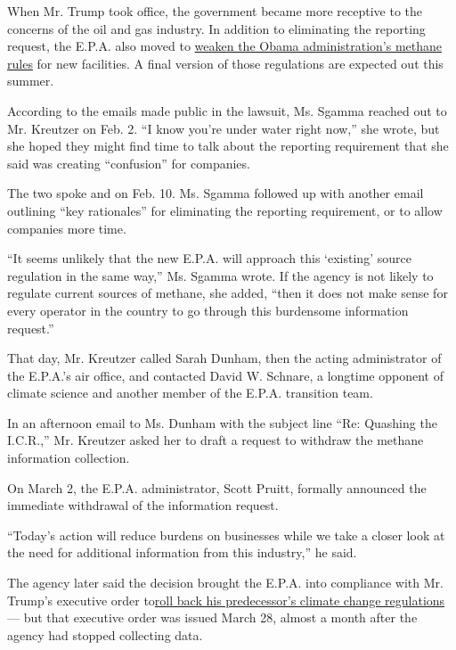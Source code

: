 When Mr. Trump took office, the government became more receptive to the
concerns of the oil and gas industry. In addition to eliminating the
reporting request, the E.P.A. also moved to
\href{https://www.nytimes3xbfgragh.onion/2018/09/10/climate/methane-emissions-epa.html}{weaken
the Obama administration's methane rules} for new facilities. A final
version of those regulations are expected out this summer.

According to the emails made public in the lawsuit, Ms. Sgamma reached
out to Mr. Kreutzer on Feb. 2. ``I know you're under water right now,''
she wrote, but she hoped they might find time to talk about the
reporting requirement that she said was creating ``confusion'' for
companies.

The two spoke and on Feb. 10. Ms. Sgamma followed up with another email
outlining ``key rationales'' for eliminating the reporting requirement,
or to allow companies more time.

``It seems unlikely that the new E.P.A. will approach this `existing'
source regulation in the same way,'' Ms. Sgamma wrote. If the agency is
not likely to regulate current sources of methane, she added, ``then it
does not make sense for every operator in the country to go through this
burdensome information request.''

That day, Mr. Kreutzer called Sarah Dunham, then the acting
administrator of the E.P.A.'s air office, and contacted David W.
Schnare, a longtime opponent of climate science and another member of
the E.P.A. transition team.

In an afternoon email to Ms. Dunham with the subject line ``Re: Quashing
the I.C.R.,'' Mr. Kreutzer asked her to draft a request to withdraw the
methane information collection.

On March 2, the E.P.A. administrator, Scott Pruitt, formally announced
the immediate withdrawal of the information request.

``Today's action will reduce burdens on businesses while we take a
closer look at the need for additional information from this industry,''
he said.

The agency later said the decision brought the E.P.A. into compliance
with Mr. Trump's executive order
to\href{https://www.nytimes3xbfgragh.onion/2017/03/28/climate/trump-executive-order-climate-change.html}{roll
back his predecessor's climate change regulations} --- but that
executive order was issued March 28, almost a month after the agency had
stopped collecting data.

